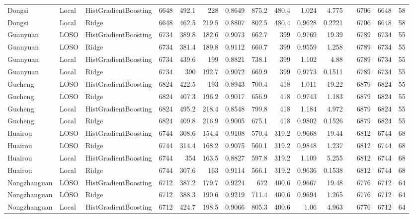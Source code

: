 \begin{tabular}{lllrrrrrrrrlrrr}
Dongsi & Local & HistGradientBoosting & 6648 & 492.1 & 228 & 0.8649 & 875.2 & 480.4 & 1.024 & 4.775 &  & 6706 & 6648 & 58 \\
Dongsi & Local & Ridge & 6648 & 462.5 & 219.5 & 0.8807 & 802.5 & 480.4 & 0.9628 & 0.2221 &  & 6706 & 6648 & 58 \\
Guanyuan & LOSO & HistGradientBoosting & 6734 & 389.8 & 182.6 & 0.9073 & 662.7 & 399 & 0.9769 & 19.39 &  & 6789 & 6734 & 55 \\
Guanyuan & LOSO & Ridge & 6734 & 381.4 & 189.8 & 0.9112 & 660.7 & 399 & 0.9559 & 1.258 &  & 6789 & 6734 & 55 \\
Guanyuan & Local & HistGradientBoosting & 6734 & 439.6 & 199 & 0.8821 & 738.1 & 399 & 1.102 & 4.88 &  & 6789 & 6734 & 55 \\
Guanyuan & Local & Ridge & 6734 & 390 & 192.7 & 0.9072 & 669.9 & 399 & 0.9773 & 0.1511 &  & 6789 & 6734 & 55 \\
Gucheng & LOSO & HistGradientBoosting & 6824 & 422.5 & 193 & 0.8943 & 700.4 & 418 & 1.011 & 19.22 &  & 6879 & 6824 & 55 \\
Gucheng & LOSO & Ridge & 6824 & 407.3 & 196.2 & 0.9017 & 656.9 & 418 & 0.9743 & 1.183 &  & 6879 & 6824 & 55 \\
Gucheng & Local & HistGradientBoosting & 6824 & 495.2 & 218.4 & 0.8548 & 799.8 & 418 & 1.184 & 4.972 &  & 6879 & 6824 & 55 \\
Gucheng & Local & Ridge & 6824 & 409.8 & 216.9 & 0.9005 & 675.1 & 418 & 0.9802 & 0.1526 &  & 6879 & 6824 & 55 \\
Huairou & LOSO & HistGradientBoosting & 6744 & 308.6 & 154.4 & 0.9108 & 570.4 & 319.2 & 0.9668 & 19.44 &  & 6812 & 6744 & 68 \\
Huairou & LOSO & Ridge & 6744 & 314.4 & 168.2 & 0.9075 & 560.1 & 319.2 & 0.9848 & 1.237 &  & 6812 & 6744 & 68 \\
Huairou & Local & HistGradientBoosting & 6744 & 354 & 163.5 & 0.8827 & 597.8 & 319.2 & 1.109 & 5.255 &  & 6812 & 6744 & 68 \\
Huairou & Local & Ridge & 6744 & 307.6 & 163 & 0.9114 & 566.1 & 319.2 & 0.9636 & 0.1538 &  & 6812 & 6744 & 68 \\
Nongzhanguan & LOSO & HistGradientBoosting & 6712 & 387.2 & 179.7 & 0.9224 & 672 & 400.6 & 0.9667 & 19.48 &  & 6776 & 6712 & 64 \\
Nongzhanguan & LOSO & Ridge & 6712 & 388.3 & 190.6 & 0.9219 & 711.4 & 400.6 & 0.9694 & 1.265 &  & 6776 & 6712 & 64 \\
Nongzhanguan & Local & HistGradientBoosting & 6712 & 424.7 & 198.5 & 0.9066 & 805.3 & 400.6 & 1.06 & 4.963 &  & 6776 & 6712 & 64 \\

\end{tabular}
